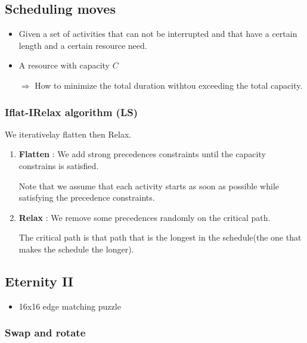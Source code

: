 \subsection{Scheduling moves}

\begin{itemize}
    \item Given a set of activities that can not be interrupted and
        that have a certain length and a certain resource need.
    \item A resource with capacity $C$
    \item[$\Rightarrow$] How to minimize the total duration withtou
        exceeding the total capacity.
\end{itemize}

\subsubsection{Iflat-IRelax algorithm (LS)}

We iterativelay flatten then Relax.
\begin{enumerate}
    \item \textbf{Flatten} : We add strong precedences constraints until
        the capacity constrains is satisfied.

        Note that we assume that each
        activity starts as soon as possible while satisfying
        the precedence constraints.

    \item \textbf{Relax} : We remove some precedences randomly on the critical
        path.

        The critical path is that path that is the longest in the
        schedule(the one that makes the schedule the longer).
\end{enumerate}

\subsection{Eternity II}
\begin{itemize}
    \item 16x16 edge matching puzzle
    \end{itemize}

\subsubsection{Swap and rotate}

